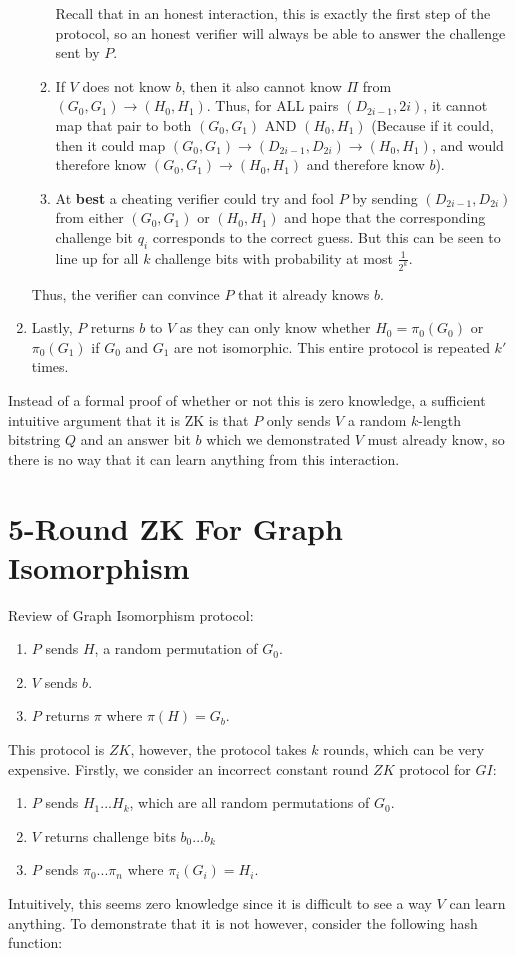 \documentclass[11pt]{article}
\begin{document}
\begin{enumerate}
\begin{enumerate}
        Recall that in an honest interaction, this is exactly the first step of the protocol, so an honest verifier will always be able to answer the challenge sent by $P$.
        \item If $V$ does not know $b$, then it also cannot know $\Pi$ from $(G_0,G_1) \rightarrow (H_0,H_1)$. Thus, for ALL pairs $(D_{2i-1},2i)$, it cannot map that pair to both $(G_0,G_1)$ AND $(H_0,H_1)$ (Because if it could, then it could map $(G_0,G_1) \rightarrow (D_{2i-1}, D_{2i}) \rightarrow (H_0,H_1)$, and would therefore know $(G_0,G_1) \rightarrow (H_0,H_1)$ and therefore know $b$).
        \item At \textbf{best} a cheating verifier could try and fool $P$ by sending $(D_{2i-1},D_{2i})$ from either $(G_0,G_1)$ or $(H_0,H_1)$ and hope that the corresponding challenge bit $q_i$ corresponds to the correct guess. But this can be seen to line up for all $k$ challenge bits with probability at most $\frac{1}{2^k}$.
    \end{enumerate}
    Thus, the verifier can convince $P$ that it already knows $b$.
    \item Lastly, $P$ returns $b$ to $V$ as they can only know whether $H_0 = \pi_0(G_0)$ or $\pi_0(G_1)$ if $G_0$ and $G_1$ are not isomorphic. This entire protocol is repeated $k'$ times. 
\end{enumerate}
Instead of a formal proof of whether or not this is zero knowledge, a sufficient intuitive argument that it is ZK is that $P$ only sends $V$ a random $k$-length bitstring $Q$ and an answer bit $b$ which we demonstrated $V$ must already know, so there is no way that it can learn anything from this interaction.

\section{5-Round ZK For Graph Isomorphism}
Review of Graph Isomorphism protocol:
\begin{enumerate}
    \item $P$ sends $H$, a random permutation of $G_0$.
    \item $V$ sends $b$.
    \item $P$ returns $\pi$ where $\pi(H) = G_b$.
\end{enumerate}
This protocol is $ZK$, however, the protocol takes $k$ rounds, which can be very expensive. Firstly, we consider an incorrect constant round $ZK$ protocol for $GI$:
\begin{enumerate}
    \item $P$ sends $H_1...H_k$, which are all random permutations of $G_0$.
    \item $V$ returns challenge bits $b_0...b_k$
    \item $P$ sends $\pi_0...\pi_n$ where $\pi_i(G_i) = H_i$.
\end{enumerate}
Intuitively, this seems zero knowledge since it is difficult to see a way $V$ can learn anything. To demonstrate that it is not however, consider the following hash function:
\vspace{1em}
\end{document}
